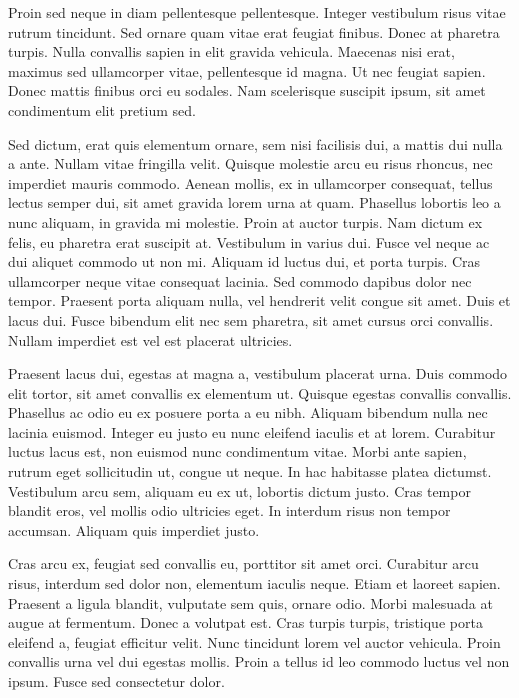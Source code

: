 \documentclass[11pt,a4paper]{article}
\begin{document}
Proin sed neque in diam pellentesque pellentesque. Integer vestibulum risus vitae rutrum tincidunt. Sed ornare quam vitae erat feugiat finibus. Donec at pharetra turpis. Nulla convallis sapien in elit gravida vehicula. Maecenas nisi erat, maximus sed ullamcorper vitae, pellentesque id magna. Ut nec feugiat sapien. Donec mattis finibus orci eu sodales. Nam scelerisque suscipit ipsum, sit amet condimentum elit pretium sed.

Sed dictum, erat quis elementum ornare, sem nisi facilisis dui, a mattis dui nulla a ante. Nullam vitae fringilla velit. Quisque molestie arcu eu risus rhoncus, nec imperdiet mauris commodo. Aenean mollis, ex in ullamcorper consequat, tellus lectus semper dui, sit amet gravida lorem urna at quam. Phasellus lobortis leo a nunc aliquam, in gravida mi molestie. Proin at auctor turpis. Nam dictum ex felis, eu pharetra erat suscipit at. Vestibulum in varius dui. Fusce vel neque ac dui aliquet commodo ut non mi. Aliquam id luctus dui, et porta turpis. Cras ullamcorper neque vitae consequat lacinia. Sed commodo dapibus dolor nec tempor. Praesent porta aliquam nulla, vel hendrerit velit congue sit amet. Duis et lacus dui. Fusce bibendum elit nec sem pharetra, sit amet cursus orci convallis. Nullam imperdiet est vel est placerat ultricies.

Praesent lacus dui, egestas at magna a, vestibulum placerat urna. Duis commodo elit tortor, sit amet convallis ex elementum ut. Quisque egestas convallis convallis. Phasellus ac odio eu ex posuere porta a eu nibh. Aliquam bibendum nulla nec lacinia euismod. Integer eu justo eu nunc eleifend iaculis et at lorem. Curabitur luctus lacus est, non euismod nunc condimentum vitae. Morbi ante sapien, rutrum eget sollicitudin ut, congue ut neque. In hac habitasse platea dictumst. Vestibulum arcu sem, aliquam eu ex ut, lobortis dictum justo. Cras tempor blandit eros, vel mollis odio ultricies eget. In interdum risus non tempor accumsan. Aliquam quis imperdiet justo.

Cras arcu ex, feugiat sed convallis eu, porttitor sit amet orci. Curabitur arcu risus, interdum sed dolor non, elementum iaculis neque. Etiam et laoreet sapien. Praesent a ligula blandit, vulputate sem quis, ornare odio. Morbi malesuada at augue at fermentum. Donec a volutpat est. Cras turpis turpis, tristique porta eleifend a, feugiat efficitur velit. Nunc tincidunt lorem vel auctor vehicula. Proin convallis urna vel dui egestas mollis. Proin a tellus id leo commodo luctus vel non ipsum. Fusce sed consectetur dolor. 
\end{document}
